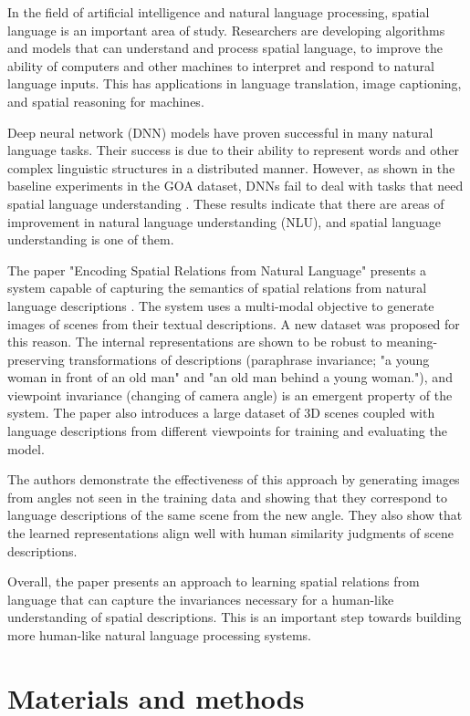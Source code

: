 \documentclass[11pt,a4paper]{article}
\begin{document}
In the field of artificial intelligence and natural language processing, spatial language is an important area of study. Researchers are developing algorithms and models that can understand and process spatial language, to improve the ability of computers and other machines to interpret and respond to natural language inputs. This has applications in language translation, image captioning, and spatial reasoning for machines.

Deep neural network (DNN) models have proven successful in many natural language tasks. Their success is due to their ability to represent words and other complex linguistic structures in a distributed manner. However, as shown in the baseline experiments in the GOA dataset, DNNs fail to deal with tasks that need spatial language understanding \cite{hudsonGQANewDataset2019}. These results indicate that there are  areas of improvement in natural language understanding (NLU), and spatial language understanding is one of them.

The paper "Encoding Spatial Relations from Natural Language" presents a system capable of capturing the semantics of spatial relations from natural language descriptions \citet{ramalho2018encoding}. The system uses a multi-modal objective to generate images of scenes from their textual descriptions. A new dataset was proposed for this reason. The internal representations are shown to be robust to meaning-preserving transformations of descriptions (paraphrase invariance; "a young woman in front of an old man" and "an old man behind a young woman."), and viewpoint invariance (changing of camera angle) is an emergent property of the system. The paper also introduces a large dataset of 3D scenes coupled with language descriptions from different viewpoints for training and evaluating the model.

The authors demonstrate the effectiveness of this approach by generating images from angles not seen in the training data and showing that they correspond to language descriptions of the same scene from the new angle. They also show that the learned representations align well with human similarity judgments of scene descriptions.

Overall, the paper presents an approach to learning spatial relations from language that can capture the invariances necessary for a human-like understanding of spatial descriptions. This is an important step towards building more human-like natural language processing systems.


\section{Materials and methods}
\end{document}
